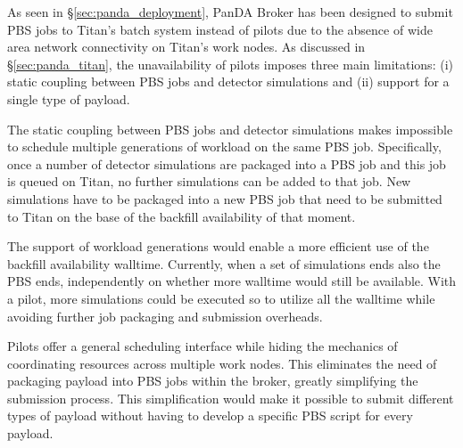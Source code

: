As seen in \S\ref{sec:panda_deployment}, PanDA Broker has been designed to
submit PBS jobs to Titan's batch system instead of pilots due to the absence of
wide area network connectivity on Titan's work nodes. As discussed in
\S\ref{sec:panda_titan}, the unavailability of pilots imposes three main
limitations: (i) static coupling between PBS jobs and detector simulations and
(ii) support for a single type of payload.

The static coupling between PBS jobs and detector simulations makes impossible
to schedule multiple generations of workload on the same PBS job. Specifically,
once a number of detector simulations are packaged into a PBS job and this job
is queued on Titan, no further simulations can be added to that job. New
simulations have to be packaged into a new PBS job that need to be submitted to
Titan on the base of the backfill availability of that moment.

The support of workload generations would enable a more efficient use of the
backfill availability walltime. Currently, when a set of simulations ends also
the PBS ends, independently on whether more walltime would still be available.
With a pilot, more simulations could be executed so to utilize all the walltime
while avoiding further job packaging and submission overheads.

Pilots offer a general scheduling interface while hiding the mechanics of
coordinating resources across multiple work nodes. This eliminates the need of
packaging payload into PBS jobs within the broker, greatly simplifying the
submission process. This simplification would make it possible to submit
different types of payload without having to develop a specific PBS script for
every payload.
